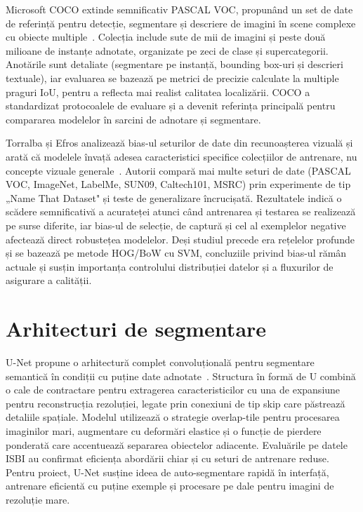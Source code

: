 Microsoft COCO extinde semnificativ PASCAL VOC, propunând un set de date de referință pentru detecție, segmentare și descriere de imagini în scene complexe cu obiecte multiple~\cite{lin2015microsoftcococommonobjects}. Colecția include sute de mii de imagini și peste două milioane de instanțe adnotate, organizate pe zeci de clase și supercategorii. Anotările sunt detaliate (segmentare pe instanță, bounding box-uri și descrieri textuale), iar evaluarea se bazează pe metrici de precizie calculate la multiple praguri IoU, pentru a reflecta mai realist calitatea localizării. COCO a standardizat protocoalele de evaluare și a devenit referința principală pentru compararea modelelor în sarcini de adnotare și segmentare.

Torralba și Efros analizează bias-ul seturilor de date din recunoașterea vizuală și arată că modelele învață adesea caracteristici specifice colecțiilor de antrenare, nu concepte vizuale generale~\cite{5995347}. Autorii compară mai multe seturi de date (PASCAL VOC, ImageNet, LabelMe, SUN09, Caltech101, MSRC) prin experimente de tip „Name That Dataset" și teste de generalizare încrucișată. Rezultatele indică o scădere semnificativă a acurateței atunci când antrenarea și testarea se realizează pe surse diferite, iar bias-ul de selecție, de captură și cel al exemplelor negative afectează direct robustețea modelelor. Deși studiul precede era rețelelor profunde și se bazează pe metode HOG/BoW cu SVM, concluziile privind bias-ul rămân actuale și susțin importanța controlului distribuției datelor și a fluxurilor de asigurare a calității.

\section{Arhitecturi de segmentare}

U-Net propune o arhitectură complet convoluțională pentru segmentare semantică în condiții cu puține date adnotate~\cite{ronneberger2015unetconvolutionalnetworksbiomedical}. Structura în formă de U combină o cale de contractare pentru extragerea caracteristicilor cu una de expansiune pentru reconstrucția rezoluției, legate prin conexiuni de tip skip care păstrează detaliile spațiale. Modelul utilizează o strategie overlap-tile pentru procesarea imaginilor mari, augmentare cu deformări elastice și o funcție de pierdere ponderată care accentuează separarea obiectelor adiacente. Evaluările pe datele ISBI au confirmat eficiența abordării chiar și cu seturi de antrenare reduse. Pentru proiect, U-Net susține ideea de auto-segmentare rapidă în interfață, antrenare eficientă cu puține exemple și procesare pe dale pentru imagini de rezoluție mare.

